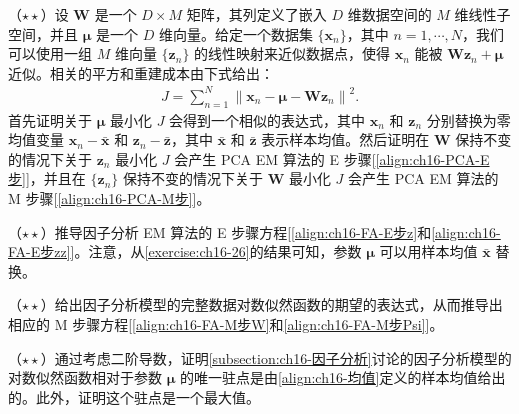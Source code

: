 \documentclass[../../main.tex]{subfiles}
\begin{document}
\begin{exercise}\label{exercise:ch16-23}
（$\star\star$）设 $\bm{W}$ 是一个 $D\times M$ 矩阵，其列定义了嵌入 $D$ 维数据空间的 $M$ 维线性子空间，并且 $\bm{\mu}$ 是一个 $D$ 维向量。给定一个数据集 $\{\bm{x}_n\}$，其中 $n=1,\cdots,N$，我们可以使用一组 $M$ 维向量 $\{\bm{z}_n\}$ 的线性映射来近似数据点，使得 $\bm{x}_n$ 能被 $\bm{W}\bm{z}_n+\bm{\mu}$ 近似。相关的平方和重建成本由下式给出：
\begin{align}
  J=\sum_{n=1}^{N}\left\|\bm{x}_n-\bm{\mu}-\bm{W}\bm{z}_n\right\|^2 .
  \label{align:ch16-习题16.23重建成本}
\end{align}
首先证明关于 $\bm{\mu}$ 最小化 $J$ 会得到一个相似的表达式，其中 $\bm{x}_n$ 和 $\bm{z}_n$ 分别替换为零均值变量 $\bm{x}_n-\bar{\bm{x}}$ 和 $\bm{z}_n-\bar{\bm{z}}$，其中 $\bar{\bm{x}}$ 和 $\bar{\bm{z}}$ 表示样本均值。然后证明在 $\bm{W}$ 保持不变的情况下关于 $\bm{z}_n$ 最小化 $J$ 会产生 PCA EM 算法的 E 步骤[\eqref{align:ch16-PCA-E步}]，并且在 $\{\bm{z}_n\}$ 保持不变的情况下关于 $\bm{W}$ 最小化 $J$ 会产生 PCA EM 算法的 M 步骤[\eqref{align:ch16-PCA-M步}]。
\end{exercise}

\begin{exercise}\label{exercise:ch16-24}
（$\star\star$）推导因子分析 EM 算法的 E 步骤方程[\eqref{align:ch16-FA-E步z}和\eqref{align:ch16-FA-E步zz}]。注意，从\cref{exercise:ch16-26}的结果可知，参数 $\bm{\mu}$ 可以用样本均值 $\bar{\bm{x}}$ 替换。
\end{exercise}

\begin{exercise}\label{exercise:ch16-25}
（$\star\star$）给出因子分析模型的完整数据对数似然函数的期望的表达式，从而推导出相应的 M 步骤方程[\eqref{align:ch16-FA-M步W}和\eqref{align:ch16-FA-M步Psi}]。
\end{exercise}

\begin{exercise}\label{exercise:ch16-26}
（$\star\star$）通过考虑二阶导数，证明\cref{subsection:ch16-因子分析}讨论的因子分析模型的对数似然函数相对于参数 $\bm{\mu}$ 的唯一驻点是由\eqref{align:ch16-均值}定义的样本均值给出的。此外，证明这个驻点是一个最大值。
\end{exercise}
\end{document}
